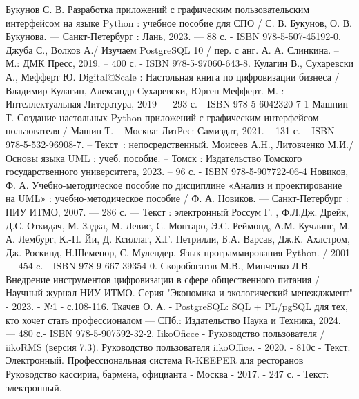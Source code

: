 
\begin{thebibliography}{9}

     Букунов С. В. Разработка приложений с графическим пользовательским интерфейсом на языке Python : учебное пособие для СПО / С. В. Букунов, О. В. Букунова. — Санкт-Петербург : Лань, 2023. — 88 с. - ISBN 978-5-507-45192-0.
     Джуба	С.,	Волков	А./ Изучаем PostgreSQL 10 / пер. с анг. А. А. Слинкина. – М.: ДМК Пресс, 2019. – 400 с. - ISBN 978-5-97060-643-8.
    Кулагин В., Сухаревски А., Мефферт Ю. Digital@Scale : Настольная книга по цифровизации бизнеса / Владимир Кулагин, Александр Сухаревски, Юрген Мефферт. М. : Интеллектуальная Литература, 2019 — 293 с. - ISBN 978-5-6042320-7-1
    	Машнин Т. Создание настольных Python приложений с графическим интерфейсом пользователя / Машин Т. – Москва: ЛитРес: Самиздат, 2021. – 131 с. – ISBN 978-5-532-96908-7. – Текст~: непосредственный.
     Моисеев А.Н., Литовченко М.И./ Основы языка UML : учеб. пособие. – Томск : Издательство Томского государственного университета, 2023. – 96 с. - ISBN 978-5-907722-06-4
    Новиков, Ф. А. Учебно-методическое пособие по дисциплине «Анализ и проектирование на UML» : учебно-методическое пособие / Ф. А. Новиков. — Санкт-Петербург : НИУ ИТМО, 2007. — 286 с. — Текст : электронный
     Россум Г. , Ф.Л.Дж. Дрейк, Д.С. Откидач, М. Задка, М. Левис, С. Монтаро, Э.С. Реймонд, А.М. Кучлинг, М.-А. Лембург, К.-П. Йи, Д. Ксиллаг, Х.Г. Петрилли, Б.А. Варсав, Дж.К. Ахлстром, Дж. Роскинд, Н.Шеменор, С. Мулендер. Язык программирования Python. / 2001 — 454 c. - ISBN 978-9-667-39354-0.
     Скоробогатов М.В., Минченко Л.В. Внедрение инструментов цифровизации в сфере общественного питания / Научный журнал НИУ ИТМО. Серия "Экономика и экологический менежджмент" - 2023. - №1 - с.108-116.
     Ткачев О. А. - PostgreSQL: SQL + PL/pgSQL для тех, кто хочет стать профессионалом — СПб.: Издательство Наука и Техника, 2024. — 480 с.- ISBN 978-5-907592-32-2.
	 IikoOficce - Руководство пользователя / iikoRMS (версия 7.3). Руководство пользователя iikoOffice. - 2020. - 810с - Текст: Электронный.
	 Профессиональная система R-KEEPER для ресторанов Руководство кассириа, бармена, официанта - Москва - 2017. - 247 с. - Текст: электронный.
\end{thebibliography}
